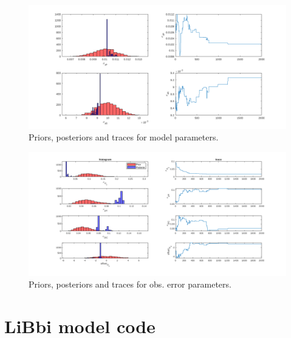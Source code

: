 \documentclass{ruthesis}
\begin{document}
\begin{figure}
	\centerline{\includegraphics[width=1.3\textwidth]{images_microalgae/plots/parameters_model2}}
	\caption[.]{Priors, posteriors and traces for model parameters.}
	\label{fig:pos_parameters_model2}
\end{figure}

\begin{figure}
	\centerline{\includegraphics[width=1.3\textwidth]{images_microalgae/plots/parameters_obserror}}
	\caption[.]{Priors, posteriors and traces for obs. error parameters.}
	\label{fig:pos_parameters_obserror}
\end{figure}



\appendix

\chapter{LiBbi model code}\label{appendix_micro_libbi_code}
\end{document}
